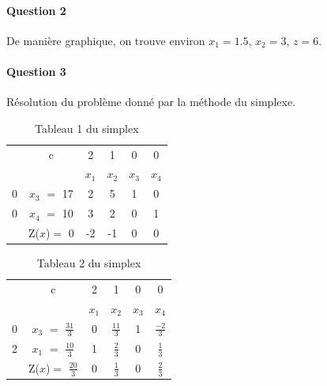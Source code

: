 \documentclass[a4paper, 12pt]{article}
\begin{document}
\paragraph{Question 2}
De manière graphique, on trouve environ $x_1 = 1.5$, $x_2 = 3$, $z = 6$.

\paragraph{Question 3}

Résolution du problème donné par la méthode du simplexe.

\begin{table}[h!]	
\centering
	\begin{tabular}{|c|c|c|c|c|c|}
	\hline
      & c & 2 & 1 & 0 & 0 \\ 
      \cline{2-6}
       &  & $x_{1}$ & $x_{2}$  & $x_{3}$  & $x_{4}$ \\
       \hline
   0 & $x_{3}$  $=$ 17 & 2 & 5 & 1 & 0 \\
      \hline
	0 & $x_{4}$ $=$ 10  & 3 & 2 & 0 & 1 \\
	  \hline
	 & Z($x$)$=$ 0 & -2 & -1 & 0 & 0\\
	  \hline
	\end{tabular}
\caption {Tableau 1 du simplex}
\end{table}


\begin{table}[h!]	
\centering
	\begin{tabular}{|c|c|c|c|c|c|}
	\hline
      & c & 2 & 1 & 0 & 0 \\ 
      \cline{2-6}
       &  & $x_{1}$ & $x_{2}$  & $x_{3}$  & $x_{4}$ \\
       \hline
   0 & $x_{3}$  $=$ $\frac{31}{3}$ & 0 & $\frac{11}{3}$ & 1 & $\frac{-2}{3}$ \\
      \hline
	2 & $x_{1}$ $=$ $\frac{10}{3}$  & 1 & $\frac{2}{3}$ & 0 & $\frac{1}{3}$ \\
	  \hline
	 & Z($x$)$=$ $\frac{20}{3}$ & 0 & $\frac{1}{3}$ & 0 & $\frac{2}{3}$\\
	  \hline
	\end{tabular}
\caption {Tableau 2 du simplex}
\end{table}
\end{document}
